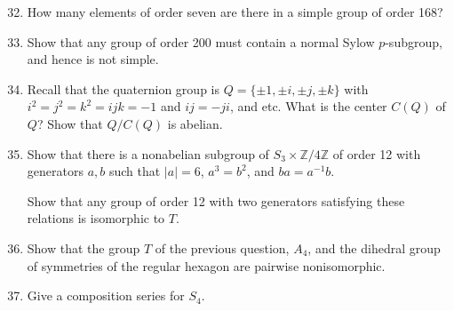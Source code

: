 \documentclass[12pt]{article}
\newcommand{\ZZ}{{\mathbb Z}}
\def\defcolor#1{\Maroon{#1}}
\begin{document}
\begin{enumerate}
\setcounter{enumi}{31}


\item  
    How many elements of order seven are there in a simple group of order 168?\vspace{-2pt}



\item   Show that any group of order 200 must contain a normal Sylow $p$-subgroup, and hence is not simple.


\item
    Recall that the quaternion group is $Q=\{\pm1,\pm i, \pm j, \pm k\}$ with $i^2=j^2=k^2=ijk=-1$ and $ij=-ji$, and etc.
    What is the center $C(Q)$ of $Q$?
    Show that $Q/C(Q)$ is abelian.


\item   Show that there is a nonabelian subgroup \defcolor{$T$} of $S_3\times \ZZ/4\ZZ$ of order 12 with generators $a,b$ such that $|a|=6$,
  $a^3=b^2$, and $ba=a^{-1}b$.

  Show that any group of order 12 with two generators satisfying these relations  is isomorphic to $T$.
 

\item   Show that the group $T$ of the previous question, $A_4$, and the dihedral group of symmetries of the regular hexagon are pairwise
  nonisomorphic. 
  
\item Give a composition series for $S_4$.\vspace{-2pt}
  


\end{enumerate}
\end{document}
